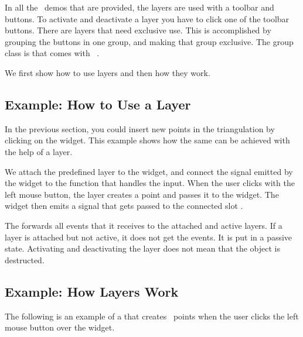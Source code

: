 \begin{ccAdvanced}
In all the \cgal\ demos that are provided, the layers are used with a
toolbar and buttons. To activate and deactivate a layer you have to
click one of the toolbar buttons. There are layers that need exclusive 
use. This is accomplished by grouping the buttons in one group, and
making that group exclusive. The group class is  that
comes with \qt\ .
\end{ccAdvanced}

We first show how to use layers and then how they work.

\subsection{Example: How to Use a Layer}

In the previous section, you could insert new points in the
triangulation by clicking on the widget. This example shows how
the same can be achieved with the help of a layer.

We attach the predefined layer  to the widget,
and connect the signal emitted by the widget to the function that
handles the input.  When the user clicks with the left mouse button,
the layer creates a point and passes it to the widget. The widget then
emits a signal that gets passed to the connected slot
.


The  forwards all events that it receives to the
attached and active layers. If a layer is attached but not active, it
does not get the events. It is put in a passive state. Activating and
deactivating the layer does not mean that the object is destructed.

\subsection{Example: How Layers Work}

The following is an example of a  that creates \cgal\ points when
the user clicks the left mouse button over the widget. 
 
